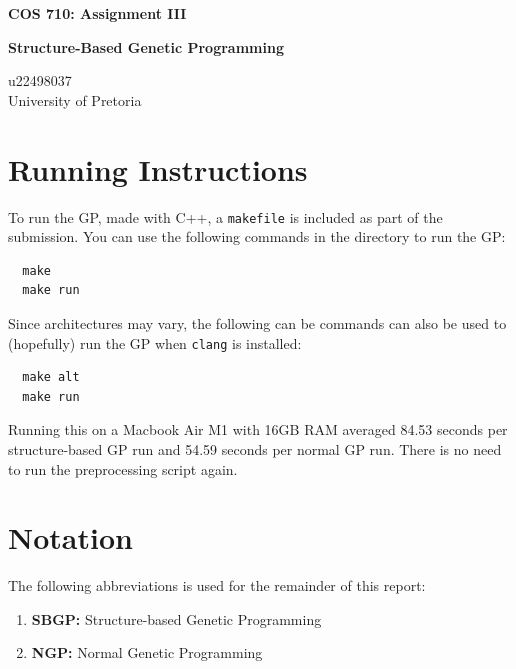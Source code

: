\documentclass{article}
\begin{document}
\begin{titlepage}
\begin{center}


{\huge \textbf{COS 710: Assignment III}}

\vspace{1cm}

{\Large \textbf{Structure-Based Genetic Programming}}

\vspace{1cm}

{\large u22498037 \\
University of Pretoria}


\vfill

\end{center}
\end{titlepage}

\tableofcontents

\newpage

\section{Running Instructions}
To run the GP, made with C++, a \texttt{makefile} is included as part of the submission. You can use the following commands in the directory to run the GP:

\begin{verbatim}
  make
  make run
\end{verbatim}

Since architectures may vary, the following can be commands can also be used to (hopefully) run the GP when \texttt{clang} is installed: 

\begin{verbatim}
  make alt
  make run
\end{verbatim}

Running this on a Macbook Air M1 with 16GB RAM averaged 84.53 seconds per structure-based GP run and 54.59 seconds per normal GP run. There is no need to run the preprocessing script again.

\section{Notation}
The following abbreviations is used for the remainder of this report:
\begin{enumerate}
  \item \textbf{SBGP:} Structure-based Genetic Programming
  \item \textbf{NGP:} Normal Genetic Programming
\end{enumerate}
\end{document}
